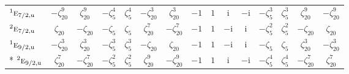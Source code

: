 \documentclass[10pt,a4paper]{article}
\numberwithin{equation}{section}
\newcommand{\irr}[1]{\text{\normalfont\scshape #1}}
\newcommand{\conjpair}[1]{{}^{#1}}
\newcommand{\ptag}[1]{\mathrm{#1}}
\newcommand{\iunit}{\mathrm{i}}
\newcommand{\rootunity}[1]{\zeta_{#1}}
\begin{document}
{\begin{longtable}{@{}lcccccccccccccc@{}}
$\conjpair{1}\irr{e}_{7/2,\ptag{u}}$ & $-\rootunity{20}^{9}$ & $\rootunity{20}^{9}$ & $-\rootunity{5}^{4}$ & $\rootunity{5}^{4}$ & $-\rootunity{20}^{3}$ & $\rootunity{20}^{3}$ & $-1$ & $1$ & $\iunit{}$ & $-\iunit{}$ & $-\rootunity{5}^{3}$ & $\rootunity{5}^{3}$ & $\rootunity{20}^{9}$ & $-\rootunity{20}^{9}$\\
$\conjpair{2}\irr{e}_{7/2,\ptag{u}}$ & $\rootunity{20}$ & $-\rootunity{20}$ & $-\rootunity{5}$ & $\rootunity{5}$ & $\rootunity{20}^{7}$ & $-\rootunity{20}^{7}$ & $-1$ & $1$ & $-\iunit{}$ & $\iunit{}$ & $-\rootunity{5}^{2}$ & $\rootunity{5}^{2}$ & $-\rootunity{20}$ & $\rootunity{20}$\\
$\conjpair{1}\irr{e}_{9/2,\ptag{u}}$ & $-\rootunity{20}^{3}$ & $\rootunity{20}^{3}$ & $-\rootunity{5}^{3}$ & $\rootunity{5}^{3}$ & $-\rootunity{20}$ & $\rootunity{20}$ & $-1$ & $1$ & $-\iunit{}$ & $\iunit{}$ & $-\rootunity{5}$ & $\rootunity{5}$ & $\rootunity{20}^{3}$ & $-\rootunity{20}^{3}$\\*
$\conjpair{2}\irr{e}_{9/2,\ptag{u}}$ & $\rootunity{20}^{7}$ & $-\rootunity{20}^{7}$ & $-\rootunity{5}^{2}$ & $\rootunity{5}^{2}$ & $\rootunity{20}^{9}$ & $-\rootunity{20}^{9}$ & $-1$ & $1$ & $\iunit{}$ & $-\iunit{}$ & $-\rootunity{5}^{4}$ & $\rootunity{5}^{4}$ & $-\rootunity{20}^{7}$ & $\rootunity{20}^{7}$\\
\bottomrule\end{longtable}}
\end{document}
